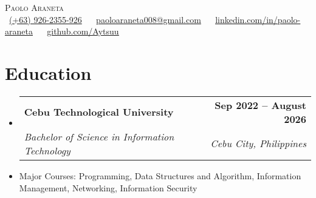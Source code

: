 \documentclass[letterpaper,11pt]{article}
\makeatletter
\newcommand{\resumeItem}[1]{
  \item\small{
    {#1 \vspace{0pt}}
  }
}
\newcommand{\resumeSubheading}[4]{
  \vspace{-2pt}\item
    \begin{tabular*}{1.0\textwidth}[t]{l@{\extracolsep{\fill}}r}
      \textbf{#1} & \textbf{\small #2} \\
      \textit{\small#3} & \textit{\small #4} \\
    \end{tabular*}\vspace{-7pt}
}
\newcommand{\resumeSubHeadingListStart}{\begin{itemize}[leftmargin=0.0in, label={}]}
\newcommand{\resumeSubHeadingListEnd}{\end{itemize}}\vspace{0pt}
\newcommand{\resumeItemListStart}{\begin{itemize}}
\newcommand{\resumeItemListEnd}{\end{itemize}\vspace{-5pt}}
\makeatother
\begin{document}
\begin{center}
    {\Large \scshape Paolo Araneta} \\[2mm]
    \footnotesize \raisebox{-0.1\height}
    \faPhone\ \underline{(+63) 926-2355-926} ~ 
    {\faEnvelope\  \underline{paoloaraneta008@gmail.com}} ~ 
    {\faLinkedin\ \underline{\href{https://www.linkedin.com/in/paolo-araneta-65b332336/}{linkedin.com/in/paolo-araneta}}} ~
    {\faGithub\ \underline{\href{https://github.com/Aytsuu}{github.com/Aytsuu}}} ~
\end{center}

\section{Education}
  \resumeSubHeadingListStart
    \resumeSubheading
      {Cebu Technological University}{Sep 2022 -- August 2026}
      {Bachelor of Science in Information Technology
      }{Cebu City, Philippines}
  \resumeSubHeadingListEnd
    \resumeItemListStart
        \vspace{-7pt}
        \resumeItem {Major Courses: Programming, Data Structures and Algorithm, Information Management, Networking, Information Security}
    \resumeItemListEnd
    \vspace{-12pt}
\end{document}
